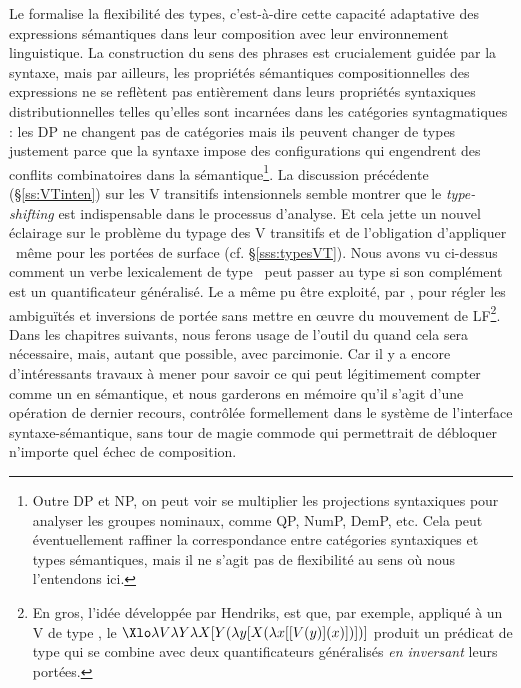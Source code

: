 


Le  formalise la flexibilité des types, c'est-à-dire cette
capacité adaptative des expressions sémantiques dans leur composition avec leur environnement linguistique.  
La construction du sens des phrases est crucialement guidée par la syntaxe, mais par ailleurs, les propriétés sémantiques compositionnelles des expressions ne se reflètent pas entièrement dans leurs propriétés syntaxiques distributionnelles telles qu'elles sont incarnées dans les catégories syntagmatiques : 
les DP ne changent pas de catégories mais ils peuvent changer de types justement parce que la syntaxe impose des configurations qui engendrent des conflits combinatoires dans la sémantique\footnote{Outre DP et NP, on peut voir se multiplier les projections syntaxiques pour analyser les groupes nominaux, comme QP, NumP, DemP, etc. Cela peut éventuellement raffiner la correspondance entre catégories syntaxiques et types sémantiques, mais il ne s'agit pas de flexibilité au sens où nous l'entendons ici.  }.
La discussion précédente (\S\ref{ss:VTinten}) sur les V transitifs intensionnels semble montrer que le \emph{type-shifting} est indispensable dans le processus d'analyse.  Et cela jette un nouvel éclairage sur le problème du typage des V transitifs et de l'obligation d'appliquer \QRa\ même pour les portées de surface (cf. \S\ref{sss:typesVT}).  Nous avons vu ci-dessus comment un verbe lexicalement de type \eet\ peut passer au type \type{\ett,\et} si son complément est un quantificateur généralisé.  Le  a même pu être exploité, par \citet{Hendriks:93}, pour régler les ambiguïtés et inversions de portée sans mettre en \oe uvre du mouvement de LF\footnote{En gros, l'idée développée par Hendriks, est que, par exemple, appliqué à un V de type \eet, le  \(\Xlo\lambda V\lambda Y\lambda X[Y(\lambda y[X(\lambda x[[V(y)](x)])])]\) produit un prédicat de type  qui se combine avec deux quantificateurs généralisés \emph{en inversant} leurs portées.
}.
Dans les chapitres suivants, nous ferons usage de l'outil du  quand cela sera nécessaire, mais, autant que possible, avec parcimonie.  Car il y a encore d'intéressants travaux à mener pour savoir ce qui peut légitimement compter comme un  en sémantique, et nous  garderons en mémoire qu'il s'agit d'une opération de dernier recours, contrôlée formellement dans le système de l'interface syntaxe-sémantique, sans tour de magie commode qui permettrait de débloquer n'importe quel échec de composition.


